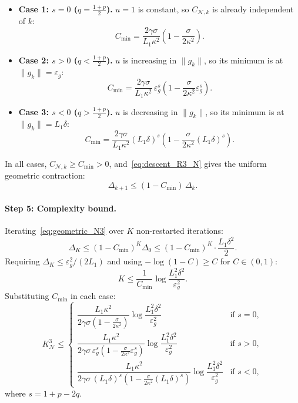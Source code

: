 \documentclass{article}
\begin{document}
\begin{itemize}
    \item \textbf{Case 1: $s = 0$ ($q = \frac{1+p}{2}$).} 
    $u = 1$ is constant, so $C_{\mathcal{N},k}$ is already independent of $k$:
    \[
    C_{\min} = \frac{2\gamma\sigma}{L_1\kappa^2}\!\left(1 - \frac{\sigma}{2\kappa^2}\right).
    \]

    \item \textbf{Case 2: $s > 0$ ($q < \frac{1+p}{2}$).} 
    $u$ is increasing in $\|g_k\|$, so its minimum is at $\|g_k\| = \varepsilon_g$:
    \[
    C_{\min} = \frac{2\gamma\sigma}{L_1\kappa^2}\,\varepsilon_g^s
    \!\left(1 - \frac{\sigma}{2\kappa^2}\varepsilon_g^s\right).
    \]

    \item \textbf{Case 3: $s < 0$ ($q > \frac{1+p}{2}$).} 
    $u$ is decreasing in $\|g_k\|$, so its minimum is at $\|g_k\| = L_1\delta$:
    \[
    C_{\min} = \frac{2\gamma\sigma}{L_1\kappa^2}(L_1\delta)^s
    \!\left(1 - \frac{\sigma}{2\kappa^2}(L_1\delta)^s\right).
    \]
\end{itemize}

In all cases, $C_{\mathcal{N},k} \geq C_{\min} > 0$, 
and~\eqref{eq:descent_R3_N} gives the uniform geometric contraction:
\begin{equation}
\label{eq:geometric_N3}
\Delta_{k+1} \leq (1 - C_{\min})\,\Delta_k.
\end{equation}

\paragraph{Step 5: Complexity bound.}
Iterating~\eqref{eq:geometric_N3} over $K$ non-restarted iterations:
\[
\Delta_K \leq (1 - C_{\min})^K \Delta_0 
\leq (1 - C_{\min})^K \cdot \frac{L_1\delta^2}{2}.
\]
Requiring $\Delta_K \leq \varepsilon_g^2/(2L_1)$ and 
using $-\log(1-C) \geq C$ for $C \in (0,1)$:
\[
K \leq \frac{1}{C_{\min}}\log\frac{L_1^2\delta^2}{\varepsilon_g^2}.
\]
Substituting $C_{\min}$ in each case:
\begin{equation}
\label{eq:K_N3}
K^3_{\mathcal{N}} \leq 
\begin{cases}
\dfrac{L_1\kappa^2}{2\gamma\sigma\!\left(1 - \frac{\sigma}{2\kappa^2}\right)}
\log\dfrac{L_1^2\delta^2}{\varepsilon_g^2} 
& \text{if } s = 0, \\[14pt]
\dfrac{L_1\kappa^2}{2\gamma\sigma\,\varepsilon_g^s\!\left(1 
- \frac{\sigma}{2\kappa^2}\varepsilon_g^s\right)}
\log\dfrac{L_1^2\delta^2}{\varepsilon_g^2} 
& \text{if } s > 0, \\[14pt]
\dfrac{L_1\kappa^2}{2\gamma\sigma\,(L_1\delta)^s\!\left(1 
- \frac{\sigma}{2\kappa^2}(L_1\delta)^s\right)}
\log\dfrac{L_1^2\delta^2}{\varepsilon_g^2} 
& \text{if } s < 0,
\end{cases}
\end{equation}
where $s = 1+p-2q$.
\end{document}
